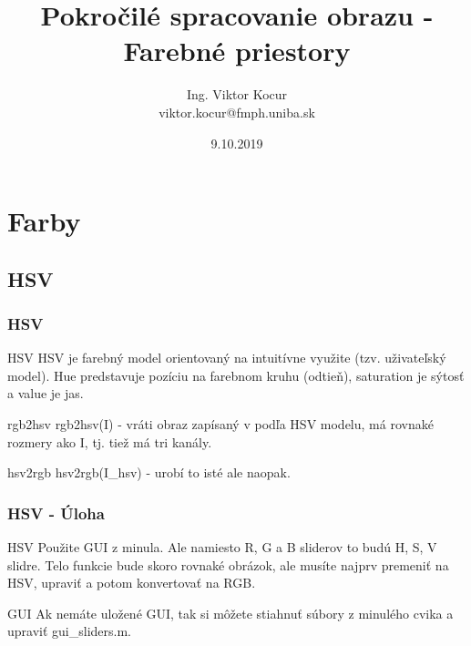 \documentclass{beamer}
\title[3. cvičenie]{Pokročilé spracovanie obrazu - Farebné priestory}
\author[Kocur]{Ing. Viktor Kocur \\{\small viktor.kocur@fmph.uniba.sk}}
\institute{DAI FMFI UK}
\date{9.10.2019}
\begin{document}

\begin{frame}
  \titlepage
\end{frame}


\section{Farby}
\subsection{HSV}
\begin{frame}
\frametitle{HSV}
  \begin{block}{HSV}
  HSV je farebný model orientovaný na intuitívne využite (tzv. uživateľský model). Hue predstavuje pozíciu na farebnom kruhu (odtieň), saturation je sýtosť a value je jas. 
  \end{block} 
  
  \begin{block}{rgb2hsv}
  rgb2hsv(I) - vráti obraz zapísaný v podľa HSV modelu, má rovnaké rozmery ako I, tj. tiež má tri kanály.
  \end{block} 
  
    \begin{block}{hsv2rgb}
  hsv2rgb(I\_hsv) - urobí to isté ale naopak.
  \end{block} 
\end{frame}

\begin{frame}
\frametitle{HSV - Úloha}
  \begin{block}{HSV}
  Použite GUI z minula. Ale namiesto R, G a B sliderov to budú H, S, V slidre. Telo funkcie bude skoro rovnaké obrázok, ale musíte najprv premeniť na HSV, upraviť a potom konvertovať na RGB.
  \end{block} 

  \begin{block}{GUI}
  Ak nemáte uložené GUI, tak si môžete stiahnuť súbory z minulého cvika a upraviť gui\_sliders.m.
  \end{block}   
\end{frame}
\end{document}
